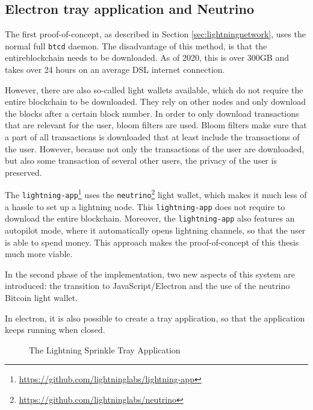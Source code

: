 \subsection{Electron tray application and Neutrino}
\label{sec:electron}
The first proof-of-concept, as described in Section \ref{sec:lightningnetwork}, uses the normal full \texttt{btcd} daemon. The disadvantage of this method, is that the entireblockchain needs to be downloaded. As of 2020, this is over 300GB and takes over 24 hours on an average DSL internet connection. 

However, there are also so-called light wallets available, which do not require the entire blockchain to be downloaded. They rely on other nodes and only download the blocks after a certain block number. In order to only download transactions that are relevant for the user, bloom filters are used. Bloom filters make sure that a part of all transactions is downloaded that at least include the transactions of the user. However, because not only the transactions of the user are downloaded, but also some transaction of several other users, the privacy of the user is preserved.

The \texttt{lightning-app}\footnote{\url{https://github.com/lightninglabs/lightning-app}} uses the \texttt{neutrino}\footnote{\url{https://github.com/lightninglabs/neutrino}} light wallet, which makes it much less of a hassle to set up a lightning node. This \texttt{lightning-app} does not require to download the entire blockchain. Moreover, the \texttt{lightning-app} also features an autopilot mode, where it automatically opens lightning channels, so that the user is able to spend money. This approach makes the proof-of-concept of this thesis much more viable. 

In the second phase of the implementation, two new aspects of this system are introduced: the transition to JavaScript/Electron and the use of the neutrino Bitcoin light wallet.

In electron, it is also possible to create a tray application, so that the application keeps running when closed. 


\begin{figure}[h!]
  \setlength{\fboxsep}{0pt}%
  \center
  \caption{The Lightning Sprinkle Tray Application}
\end{figure}

